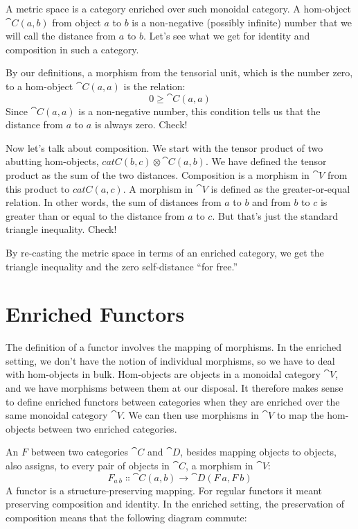 A metric space is a category enriched over such monoidal category. A
hom-object $\cat{C}(a, b)$ from object $a$ to $b$ is a
non-negative (possibly infinite) number that we will call the distance
from $a$ to $b$. Let's see what we get for identity and
composition in such a category.

By our definitions, a morphism from the tensorial unit, which is the
number zero, to a hom-object $\cat{C}(a, a)$ is the relation:
\[0 \geqslant \cat{C}(a, a)\]
Since $\cat{C}(a, a)$ is a non-negative number, this condition tells
us that the distance from $a$ to $a$ is always zero.
Check!

Now let's talk about composition. We start with the tensor product of
two abutting hom-objects, $cat{C}(b, c) \otimes \cat{C}(a, b)$. We have defined
the tensor product as the sum of the two distances. Composition is a
morphism in $\cat{V}$ from this product to $cat{C}(a, c)$. A morphism
in $\cat{V}$ is defined as the greater-or-equal relation. In other words,
the sum of distances from $a$ to $b$ and from $b$
to $c$ is greater than or equal to the distance from $a$
to $c$. But that's just the standard triangle inequality. Check!

By re-casting the metric space in terms of an enriched category, we get
the triangle inequality and the zero self-distance ``for free.''

\section{Enriched Functors}

The definition of a functor involves the mapping of morphisms. In the
enriched setting, we don't have the notion of individual morphisms, so
we have to deal with hom-objects in bulk. Hom-objects are objects in a
monoidal category $\cat{V}$, and we have morphisms between them at our
disposal. It therefore makes sense to define enriched functors between
categories when they are enriched over the same monoidal category
$\cat{V}$. We can then use morphisms in $\cat{V}$ to map the hom-objects
between two enriched categories.

An  $F$ between two categories $\cat{C}$
and $\cat{D}$, besides mapping objects to objects, also assigns, to every
pair of objects in $\cat{C}$, a morphism in $\cat{V}$:
\[F_{a\ b} \Colon \cat{C}(a, b) \to \cat{D}(F\ a, F\ b)\]
A functor is a structure-preserving mapping. For regular functors it
meant preserving composition and identity. In the enriched setting, the
preservation of composition means that the following diagram commute:

